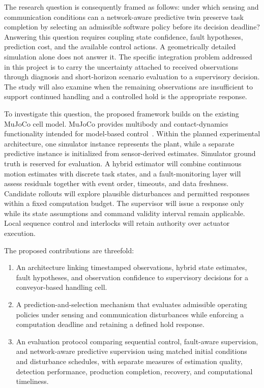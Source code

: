 The research question is consequently framed as follows: under which sensing and communication conditions can a network-aware predictive twin preserve task completion by selecting an admissible software policy before its decision deadline? Answering this question requires coupling state confidence, fault hypotheses, prediction cost, and the available control actions. A geometrically detailed simulation alone does not answer it. The specific integration problem addressed in this project is to carry the uncertainty attached to received observations through diagnosis and short-horizon scenario evaluation to a supervisory decision. The study will also examine when the remaining observations are insufficient to support continued handling and a controlled hold is the appropriate response.

To investigate this question, the proposed framework builds on the existing MuJoCo cell model. MuJoCo provides multibody and contact-dynamics functionality intended for model-based control~\cite{Todorov2012}. Within the planned experimental architecture, one simulator instance represents the plant, while a separate predictive instance is initialized from sensor-derived estimates. Simulator ground truth is reserved for evaluation. A hybrid estimator will combine continuous motion estimates with discrete task states, and a fault-monitoring layer will assess residuals together with event order, timeouts, and data freshness. Candidate rollouts will explore plausible disturbances and permitted responses within a fixed computation budget. The supervisor will issue a response only while its state assumptions and command validity interval remain applicable. Local sequence control and interlocks will retain authority over actuator execution.

The proposed contributions are threefold:
\begin{enumerate}
  \item An architecture linking timestamped observations, hybrid state estimates, fault hypotheses, and observation confidence to supervisory decisions for a conveyor-based handling cell.
  \item A prediction-and-selection mechanism that evaluates admissible operating policies under sensing and communication disturbances while enforcing a computation deadline and retaining a defined hold response.
  \item An evaluation protocol comparing sequential control, fault-aware supervision, and network-aware predictive supervision using matched initial conditions and disturbance schedules, with separate measures of estimation quality, detection performance, production completion, recovery, and computational timeliness.
\end{enumerate}

